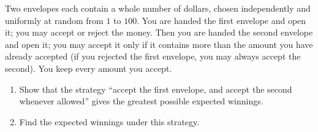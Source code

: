 Two envelopes each contain a whole number of dollars, chosen independently and uniformly at random from $1$ to $100$. You are handed the first envelope and open it; you may accept or reject the money. Then you are handed the second envelope and open it; you may accept it only if it contains more than the amount you have already accepted (if you rejected the first envelope, you may always accept the second). You keep every amount you accept.
\begin{enumerate}
\item Show that the strategy ``accept the first envelope, and accept the second whenever allowed'' gives the greatest possible expected winnings.
\item Find the expected winnings under this strategy.
\end{enumerate}
